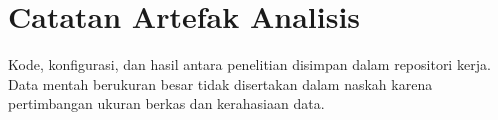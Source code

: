 \section{Catatan Artefak Analisis}

Kode, konfigurasi, dan hasil antara penelitian disimpan dalam repositori kerja. Data mentah berukuran besar tidak disertakan dalam naskah karena pertimbangan ukuran berkas dan kerahasiaan data.
